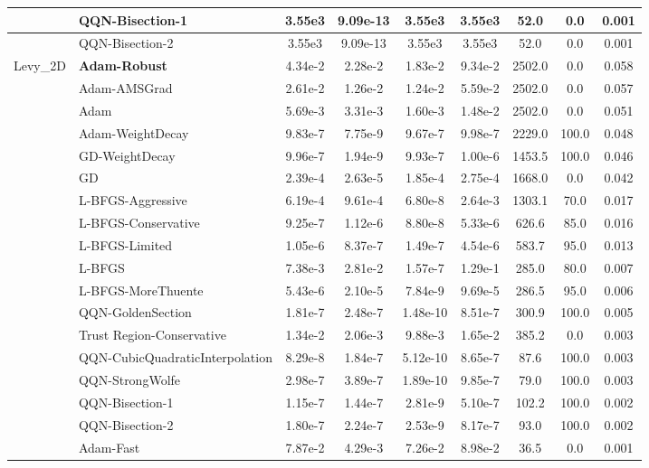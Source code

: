 \documentclass[10pt]{article}
\begin{document}
\begin{longtable}{|l|l|c|c|c|c|c|c|c|}
\hline
 & QQN-Bisection-1 & 3.55e3 & 9.09e-13 & 3.55e3 & 3.55e3 & 52.0 & 0.0 & 0.001 \\
\hline
 & QQN-Bisection-2 & 3.55e3 & 9.09e-13 & 3.55e3 & 3.55e3 & 52.0 & 0.0 & 0.001 \\
Levy\_2D & \textbf{Adam-Robust} & 4.34e-2 & 2.28e-2 & 1.83e-2 & 9.34e-2 & 2502.0 & 0.0 & 0.058 \\
\hline
 & Adam-AMSGrad & 2.61e-2 & 1.26e-2 & 1.24e-2 & 5.59e-2 & 2502.0 & 0.0 & 0.057 \\
\hline
 & Adam & 5.69e-3 & 3.31e-3 & 1.60e-3 & 1.48e-2 & 2502.0 & 0.0 & 0.051 \\
\hline
 & Adam-WeightDecay & 9.83e-7 & 7.75e-9 & 9.67e-7 & 9.98e-7 & 2229.0 & 100.0 & 0.048 \\
\hline
 & GD-WeightDecay & 9.96e-7 & 1.94e-9 & 9.93e-7 & 1.00e-6 & 1453.5 & 100.0 & 0.046 \\
\hline
 & GD & 2.39e-4 & 2.63e-5 & 1.85e-4 & 2.75e-4 & 1668.0 & 0.0 & 0.042 \\
\hline
 & L-BFGS-Aggressive & 6.19e-4 & 9.61e-4 & 6.80e-8 & 2.64e-3 & 1303.1 & 70.0 & 0.017 \\
\hline
 & L-BFGS-Conservative & 9.25e-7 & 1.12e-6 & 8.80e-8 & 5.33e-6 & 626.6 & 85.0 & 0.016 \\
\hline
 & L-BFGS-Limited & 1.05e-6 & 8.37e-7 & 1.49e-7 & 4.54e-6 & 583.7 & 95.0 & 0.013 \\
\hline
 & L-BFGS & 7.38e-3 & 2.81e-2 & 1.57e-7 & 1.29e-1 & 285.0 & 80.0 & 0.007 \\
\hline
 & L-BFGS-MoreThuente & 5.43e-6 & 2.10e-5 & 7.84e-9 & 9.69e-5 & 286.5 & 95.0 & 0.006 \\
\hline
 & QQN-GoldenSection & 1.81e-7 & 2.48e-7 & 1.48e-10 & 8.51e-7 & 300.9 & 100.0 & 0.005 \\
\hline
 & Trust Region-Conservative & 1.34e-2 & 2.06e-3 & 9.88e-3 & 1.65e-2 & 385.2 & 0.0 & 0.003 \\
\hline
 & QQN-CubicQuadraticInterpolation & 8.29e-8 & 1.84e-7 & 5.12e-10 & 8.65e-7 & 87.6 & 100.0 & 0.003 \\
\hline
 & QQN-StrongWolfe & 2.98e-7 & 3.89e-7 & 1.89e-10 & 9.85e-7 & 79.0 & 100.0 & 0.003 \\
\hline
 & QQN-Bisection-1 & 1.15e-7 & 1.44e-7 & 2.81e-9 & 5.10e-7 & 102.2 & 100.0 & 0.002 \\
\hline
 & QQN-Bisection-2 & 1.80e-7 & 2.24e-7 & 2.53e-9 & 8.17e-7 & 93.0 & 100.0 & 0.002 \\
\hline
 & Adam-Fast & 7.87e-2 & 4.29e-3 & 7.26e-2 & 8.98e-2 & 36.5 & 0.0 & 0.001 \\

\end{longtable}
\end{document}
